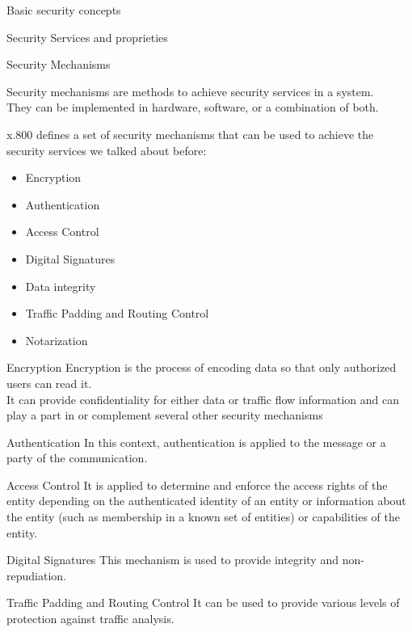 \begin{section}{Basic security concepts}
\begin{subsection}{Security Services and proprieties}
  \end{subsection}
  \begin{subsection}{Security Mechanisms}
    \begin{boxH}
      Security mechanisms are methods to achieve security services in a system.\\
      They can be implemented in hardware, software, or a combination of both.
    \end{boxH}
    x.800 defines a set of security mechanisms that can be used to achieve the security services
    we talked about before:
    \begin{itemize}
      \item Encryption
      \item Authentication
      \item Access Control
      \item Digital Signatures
    \item Data integrity
    \item Traffic Padding and Routing Control
    \item Notarization
  \end{itemize}
  \begin{paragraph}{Encryption}
    Encryption is the process of encoding data so that only authorized users can read it.\\
    It can provide confidentiality for either data or traffic flow information and can play a part 
    in or complement several other security mechanisms
  \end{paragraph}
  \begin{paragraph}{Authentication}
    In this context, authentication is applied to the message or a party of the communication.
  \end{paragraph}
  \begin{paragraph}{Access Control}
    It is applied to determine and enforce the access rights of the entity depending on the 
    authenticated identity of an entity or information about the entity (such as membership in a 
    known set of entities) or capabilities of the entity.
  \end{paragraph}
  \begin{paragraph}{Digital Signatures}
    This mechanism is used to provide integrity and non-repudiation.
  \end{paragraph}
  \begin{paragraph}{Traffic Padding and Routing Control}
    It can be used to provide various levels of protection against traffic analysis.
  \end{paragraph}

\end{subsection}
\end{section}
